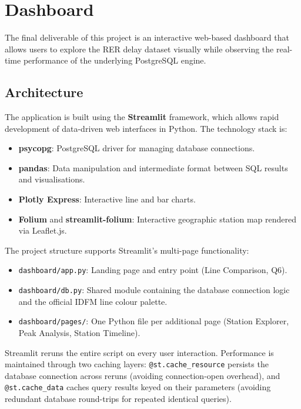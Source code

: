 \documentclass[a4paper,11pt]{article}
\begin{document}
\newpage
\section{Dashboard}
\label{sec:dashboard}

The final deliverable of this project is an interactive web-based dashboard
that allows users to explore the RER delay dataset visually while observing
the real-time performance of the underlying PostgreSQL engine.

\subsection{Architecture}

The application is built using the \textbf{Streamlit} framework, which allows
rapid development of data-driven web interfaces in Python. The technology stack
is:
\begin{itemize}
  \item \textbf{psycopg}: PostgreSQL driver for managing database connections.
  \item \textbf{pandas}: Data manipulation and intermediate format between SQL
    results and visualisations.
  \item \textbf{Plotly Express}: Interactive line and bar charts.
  \item \textbf{Folium} and \textbf{streamlit-folium}: Interactive geographic
    station map rendered via Leaflet.js.
\end{itemize}

The project structure supports Streamlit's multi-page functionality:
\begin{itemize}
  \item \texttt{dashboard/app.py}: Landing page and entry point (Line Comparison, Q6).
  \item \texttt{dashboard/db.py}: Shared module containing the database connection
    logic and the official IDFM line colour palette.
  \item \texttt{dashboard/pages/}: One Python file per additional page
    (Station Explorer, Peak Analysis, Station Timeline).
\end{itemize}

Streamlit reruns the entire script on every user interaction. Performance is
maintained through two caching layers: \texttt{@st.cache\_resource} persists
the database connection across reruns (avoiding connection-open overhead), and
\texttt{@st.cache\_data} caches query results keyed on their parameters
(avoiding redundant database round-trips for repeated identical queries).
\end{document}

